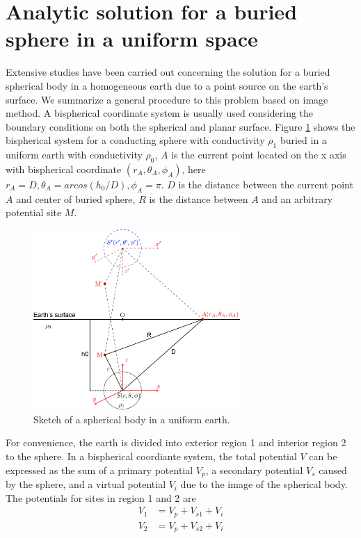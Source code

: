 \documentclass[11pt,letterpaper,leqno]{amsart}
\numberwithin{equation}{section}
\begin{document}
 \vspace{0.4cm}



\section{Analytic solution for a buried sphere in a uniform space} 
Extensive studies have been carried out concerning the solution for a buried spherical body in a homogeneous earth due to a point source on the earth's surface. We summarize a general procedure to this problem based on image method. A bispherical coordinate system  is usually used considering the boundary conditions on both the spherical and planar surface. 
Figure \ref{fig:sketch} shows the bispherical system for a conducting sphere with conductivity $\rho_1$ buried in a uniform earth with conductivity $\rho_0$, $A$ is the current point located on the x axis with bispherical coordinate $(r_A,\theta_A,\phi_A)$, here $r_A=D, \theta_A=arcos(h_0/D), \phi_A=\pi$. $D$ is the distance between the current point $A$ and center of buried sphere, $R$ is the distance between $A$ and an arbitrary potential site $M$. 
\begin{figure}[h!]
\centering
\includegraphics[width=0.7\textwidth]{sketch.jpg}
\caption{Sketch of a spherical body in a uniform earth.}
\label{fig:sketch}
\end{figure}
For convenience, the earth is divided into exterior region 1 and interior region 2 to the sphere.  In a bispherical coordiante system, the total potential $V$ can be expressed as the sum of a primary potential $V_p$, a secondary potential $V_s$ caused by the sphere, and a virtual potential $V_i$ due to the image of the spherical body. The potentials for sites in region 1 and 2 are
\begin{align}
V_1 &= V_p + V_{s1} + V_i \\
V_2 &= V_p + V_{s2} + V_i
\end{align}
\end{document}
